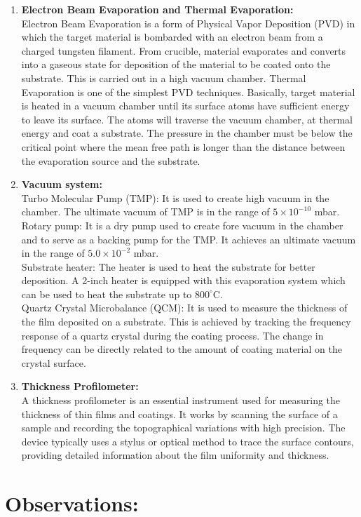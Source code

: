 \documentclass[]{report}[12 pt]
\begin{document}
	\begin{enumerate}
		\item  \textbf{Electron Beam Evaporation and Thermal Evaporation:}\\
		Electron Beam Evaporation is a 	form of Physical Vapor Deposition (PVD) in which the target material is bombarded with an electron beam from a charged tungsten filament. From crucible, material evaporates and converts into a gaseous state for deposition of the material to be coated onto the substrate. This is carried out in a high vacuum chamber. Thermal Evaporation is one of the simplest PVD techniques. Basically, target material is heated in a vacuum chamber until its surface
		atoms have sufficient energy to leave its surface. The atoms will traverse the vacuum
		chamber, at thermal energy and coat a substrate. The pressure in the chamber must be below
		the critical point where the mean free path is longer than the distance between the
		evaporation source and the substrate.
		\item \textbf{Vacuum system:}\\
		Turbo Molecular Pump (TMP): It is used to create high vacuum in the
		chamber. The ultimate vacuum of TMP is in the range of $5 \times 10 ^{-10}$ mbar. \\
		Rotary pump: It is a dry pump used to create fore vacuum in the chamber and to serve as a backing pump for the TMP. It achieves an ultimate vacuum in the range of $5.0 \times 10^{-2}$ mbar.\\ Substrate heater: The heater is used to heat the substrate for better deposition. A 2-inch heater is equipped with this 	evaporation system which can be used to heat the substrate up to $800^{\circ}$C.\\ 
		Quartz Crystal Microbalance (QCM): It is used to measure the thickness of the film deposited on a substrate. This is achieved by tracking the frequency response of a quartz crystal during the coating
		process. The change in frequency can be directly related to the amount of coating material on
		the crystal surface.
		\item \textbf{Thickness Profilometer:}\\
		A thickness profilometer is an essential instrument used for
		measuring the thickness of thin films and coatings. It works by scanning the surface of a
		sample and recording the topographical variations with high precision. The device typically uses a stylus or optical method to trace the surface contours, providing detailed information 	about the film uniformity and thickness.
		
	\end{enumerate}
	\section*{Observations:}
	\begin{center}

	\end{center}
\end{document}
